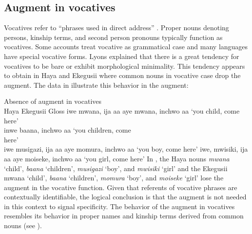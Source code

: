 \documentclass[output=paper]{langscibook}
\begin{document}
\subsection{Augment in vocatives}
Vocatives refer to “phrases used in direct address” \citep[152]{lyons1999definiteness}. Proper nouns denoting persons, kinship terms, and second person pronouns typically function as vocatives. Some accounts treat vocative as grammatical case and many languages have special vocative forms. Lyons explained that there is a great tendency for vocatives to be bare or exhibit morphological minimality. This tendency appears to obtain in Haya and Ekegusii where common nouns in vocative case drop the augment. The data in  illustrate this behavior in the augment:\largerpage

\ea Absence of augment in vocatives\smallskip\\
\label{hayagusii28}
             \hphantom{abc }Haya			\hphantom{nusigazi, ija aa}\hspace{.5ex}Ekegusii			\hphantom{wa, inchwo aa }Gloss
  \ea\label{hayagusii28a}	 {iwe mwana, ija aa}\hphantom{ip}\hspace{.5ex} 	{aye mwana, inchwo aa}\hphantom{a} 	{‘you child, come here’}\\
  \ex\label{hayagusii28b}	\hphantom{i}\hspace{.5ex}  	{inwe baana, inchwo aa}\hphantom{a} 	{‘you children, come}\\
                                  {} {} here’\\
  \ex\label{hayagusii28c}	iwe musigazi, ija aa\hspace{.5ex} 	aye momura, inchwo aa 	‘you boy, come here’
  \ex\label{hayagusii28d}	iwe, mwisiki, ija aa\hphantom{i}\hspace{.5ex} 	aye moiseke, inchwo aa 	‘you girl, come here’
  \z
\z
In , the Haya nouns \textit{mwana} ‘child’, \textit{baana} ‘children’, \textit{musigazi} ‘boy’, and \textit{mwisiki} ‘girl’ and the Ekegusii mwana ‘child’, \textit{baana} ‘children’, \textit{momura} ‘boy’, and \textit{moiseke} ‘girl’ lose the augment in the vocative function. Given that referents of vocative phrases are contextually identifiable, the logical conclusion is that the augment is not needed in this context to signal specificity. The behavior of the augment in vocatives resembles its behavior in proper names and kinship terms derived from common nouns (see ).
\end{document}
